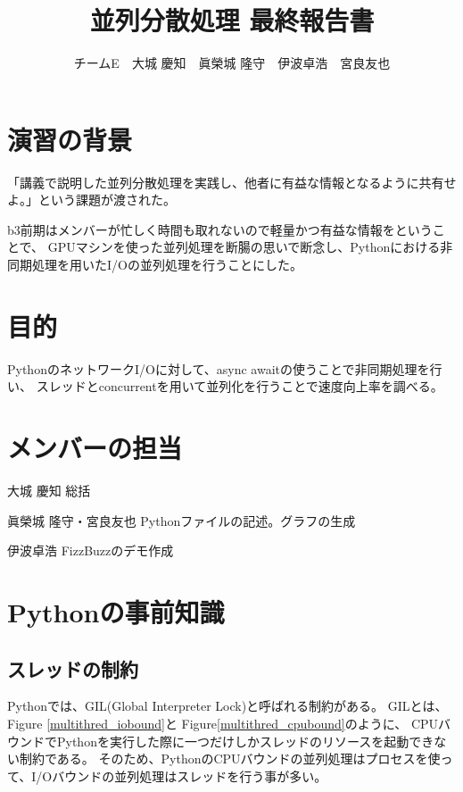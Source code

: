 \documentclass[14pt, oneside]{article}     	%
\title{並列分散処理  最終報告書}
\author{チームE　大城 慶知　眞榮城 隆守　伊波卓浩　宮良友也}
\begin{document}
\maketitle

%

\section{演習の背景}
「講義で説明した並列分散処理を実践し、他者に有益な情報となるように共有せよ。」という課題が渡された。

b3前期はメンバーが忙しく時間も取れないので軽量かつ有益な情報をということで、
GPUマシンを使った並列処理を断腸の思いで断念し、Pythonにおける非同期処理を用いたI/Oの並列処理を行うことにした。

\section{目的}
PythonのネットワークI/Oに対して、async awaitの使うことで非同期処理を行い、
スレッドとconcurrentを用いて並列化を行うことで速度向上率を調べる。

\section{メンバーの担当}

大城 慶知 総括

眞榮城 隆守・宮良友也 Pythonファイルの記述。グラフの生成

伊波卓浩 FizzBuzzのデモ作成

\section{Pythonの事前知識}

\subsection{スレッドの制約}
Pythonでは、GIL(Global Interpreter Lock)と呼ばれる制約がある。
GILとは、Figure \ref{multithred_iobound}と Figure\ref{multithred_cpubound}のように、
CPUバウンドでPythonを実行した際に一つだけしかスレッドのリソースを起動できない制約である。
そのため、PythonのCPUバウンドの並列処理はプロセスを使って、I/Oバウンドの並列処理はスレッドを行う事が多い。
\end{document}
